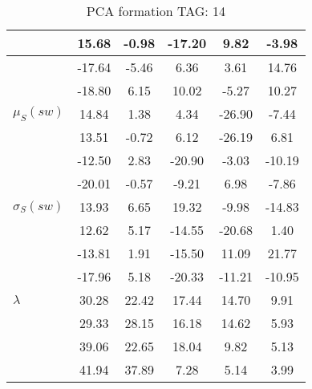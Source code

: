 \begin{table}[h!]
\begin{center}
\begin{tabular}{| l | c | c | c | c | c |}
 & 15.68  & -0.98  & -17.20  & 9.82  & -3.98 \\\hline
 & -17.64  & -5.46  & 6.36  & 3.61  & 14.76 \\\hline
 & -18.80  & 6.15  & 10.02  & -5.27  & 10.27 \\\hline
$\mu_S(sw)$ & 14.84  & 1.38  & 4.34  & -26.90  & -7.44 \\\hline
 & 13.51  & -0.72  & 6.12  & -26.19  & 6.81 \\\hline
 & -12.50  & 2.83  & -20.90  & -3.03  & -10.19 \\\hline
 & -20.01  & -0.57  & -9.21  & 6.98  & -7.86 \\\hline
$\sigma_S(sw)$ & 13.93  & 6.65  & 19.32  & -9.98  & -14.83 \\\hline
 & 12.62  & 5.17  & -14.55  & -20.68  & 1.40 \\\hline
 & -13.81  & 1.91  & -15.50  & 11.09  & 21.77 \\\hline
 & -17.96  & 5.18  & -20.33  & -11.21  & -10.95 \\\hline
$\lambda$ & 30.28  & 22.42  & 17.44  & 14.70  & 9.91 \\\hline
 & 29.33  & 28.15  & 16.18  & 14.62  & 5.93 \\\hline
 & 39.06  & 22.65  & 18.04  & 9.82  & 5.13 \\\hline
 & 41.94  & 37.89  & 7.28  & 5.14  & 3.99 \\\hline
\end{tabular}
\caption{PCA formation TAG: 14}
\end{center}
\end{table}